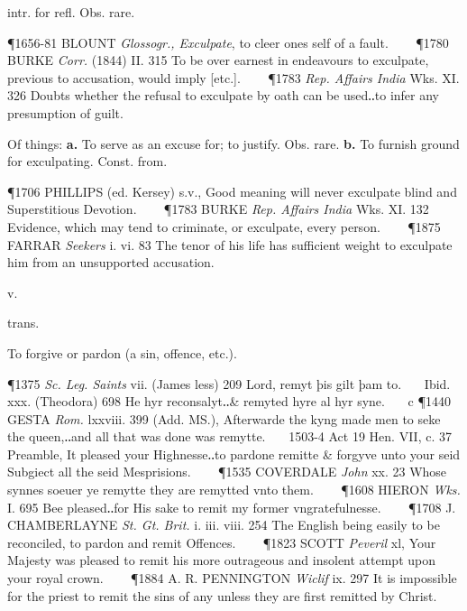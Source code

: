 \begin{description}[wide, labelwidth=!, labelindent=0pt]
\begin{myenumerate}
 intr. for refl. Obs. rare.

\P 1656-81 BLOUNT  \textit{Glossogr., Exculpate}, to cleer ones self of a fault.    
\P 1780 BURKE  \textit{Corr.} (1844) II. 315 To be over earnest in endeavours to exculpate, previous to accusation, would imply [etc.].    
\P 1783 \textit{Rep. Affairs India} Wks. XI. 326 Doubts whether the refusal to exculpate by oath can be used‥to infer any presumption of guilt.

 Of things: \textbf{a.} To serve as an excuse for; to justify. Obs. rare. \textbf{b.} To furnish ground for exculpating. Const. from.

\P 1706 PHILLIPS  (ed. Kersey) s.v., Good meaning will never exculpate blind and Superstitious Devotion.    
\P 1783 BURKE  \textit{Rep. Affairs India} Wks. XI. 132 Evidence, which may tend to criminate, or exculpate, every person.    
\P 1875 FARRAR  \textit{Seekers} i. vi. 83 The tenor of his life has sufficient weight to exculpate him from an unsupported accusation.
\end{myenumerate}


 v.

\noindent {}

\vspace{-0.3cm}

\begin{myenumerate}

 trans.

 To forgive or pardon (a sin, offence, etc.).

\P 1375  \textit{Sc. Leg. Saints} vii. (James less) 209 Lord, remyt þis gilt þam to.    Ibid. xxx. (Theodora) 698 He hyr reconsalyt‥\& remyted hyre al hyr syne.    c 
\P 1440 GESTA  \textit{Rom.} lxxviii. 399 (Add. MS.), Afterwarde the kyng made men to seke the queen,‥and all that was done was remytte.    1503-4 Act 19 Hen. VII, c. 37 Preamble, It pleased your Highnesse‥to pardone remitte \& forgyve unto your seid Subgiect all the seid Mesprisions.    
\P 1535 COVERDALE  \textit{John} xx. 23 Whose synnes soeuer ye remytte they are remytted vnto them.    
\P 1608 HIERON  \textit{Wks.} I. 695 Bee pleased‥for His sake to remit my former vngratefulnesse.    
\P 1708 J. CHAMBERLAYNE  \textit{St. Gt. Brit.} i. iii. viii. 254 The English being easily to be reconciled, to pardon and remit Offences.    
\P 1823 SCOTT  \textit{Peveril} xl, Your Majesty was pleased to remit his more outrageous and insolent attempt upon your royal crown.    
\P 1884 A. R. PENNINGTON  \textit{Wiclif} ix. 297 It is impossible for the priest to remit the sins of any unless they are first remitted by Christ.


\end{myenumerate}
\end{description}
